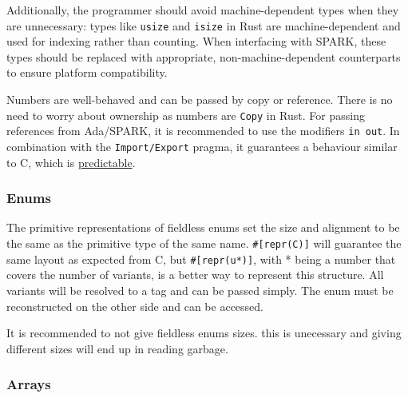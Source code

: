 \documentclass[nomenclature, english, bibtex]{kththesis}
\begin{document}
Additionally, the programmer should avoid machine-dependent types when they are unnecessary: types like \texttt{usize} and \texttt{isize} in Rust are machine-dependent and used for indexing rather than counting. When interfacing with SPARK, these types should be replaced with appropriate, non-machine-dependent counterparts to ensure platform compatibility.

Numbers are well-behaved and can be passed by copy or reference. There is no need to worry about ownership as numbers are \texttt{Copy} in Rust. For passing references from Ada/SPARK, it is recommended to use the modifiers \texttt{in out}. In combination with the \texttt{Import/Export} pragma, it guarantees a behaviour similar to C, which is \href{https://en.wikibooks.org/wiki/Ada_Programming/Types/access}{predictable}.


\subsubsection{Enums}

The primitive representations of fieldless enums set the size and alignment to be the same as the primitive type of the same name. \texttt{\#[repr(C)]} will guarantee the same layout as expected from C, but \texttt{\#[repr(u*)]}, with * being a number that covers the number of variants, is a better way to represent this structure. All variants will be resolved to a tag and can be passed simply. The enum must be reconstructed on the other side and can be accessed.

It is recommended to not give fieldless enums sizes. this is unecessary and giving different sizes will end up in reading garbage.

\subsubsection{Arrays}
\end{document}
